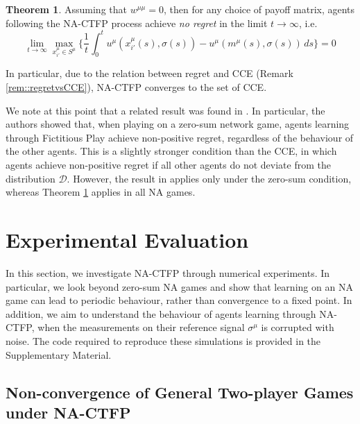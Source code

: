 \documentclass{article}
\theoremstyle{definition}
\newtheorem{theorem}{Theorem}
\newcommand{\refmu}{\sigma^{\mu}}
\begin{document}
  \begin{theorem} \label{thm::NACTFPtoCCE}
    Assuming that $w^{\mu \mu} = 0$, then for any choice of payoff matrix, agents following the
    NA-CTFP process achieve \emph{no regret} in the limit $t \rightarrow \infty$, i.e.
    \begin{equation}
      \lim_{t \rightarrow \infty} \max_{x_{i'}^\mu \in S^\mu} \Big\{ \frac{1}{t} \int_{0}^{t} u^{\mu}(x_{i'}^\mu(s), \sigma(s)) - u^{\mu}(m^\mu(s), \sigma(s)) \, ds \Big\} = 0
    \end{equation}

    In particular, due to the relation between regret and CCE (Remark \ref{rem::regretvsCCE}), NA-CTFP converges to the set of CCE.

  \end{theorem}
  
	We note at this point that a related result was found in
        \cite{Ewerhart2020}. In particular, the authors showed that,
        when playing on a zero-sum network game, agents learning
        through Fictitious Play achieve non-positive regret,
        regardless of the behaviour of the other agents. This is a
        slightly stronger condition than the CCE, in which agents
        achieve non-positive regret if all other agents do not deviate
        from the distribution $\mathcal{D}$. However, the result in
        \cite{Ewerhart2020} applies only under the zero-sum condition,
        whereas Theorem \ref{thm::NACTFPtoCCE} applies in all NA
        games.
	
\section{Experimental Evaluation}

	In this section, we investigate NA-CTFP through numerical experiments. In particular, we look beyond zero-sum NA games and show that learning on an NA game can lead to periodic behaviour, rather than convergence to a fixed point. In addition, we aim to understand the behaviour of agents learning through NA-CTFP, when the measurements on their reference signal $\refmu$ is corrupted with noise. The code required to reproduce these simulations is provided in the Supplementary Material.	

  \subsection{Non-convergence of General Two-player Games under NA-CTFP} \label{sec::NonConv}
\end{document}
